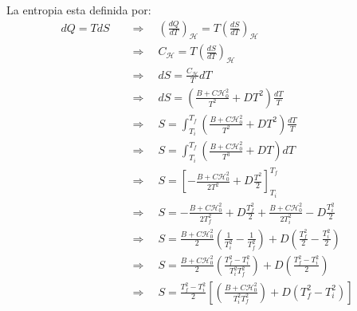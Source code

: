 \documentclass[a4paper]{article}
\begin{document}
    
    \begin{answer}[Punto 10]
        La entropia esta definida por:
        \begin{align*}
            dQ = TdS \quad &\Rightarrow \quad \left( \frac{dQ}{dT}\right)_{\mathscr{H}} = T \left(\frac{dS}{dT}\right)_\mathscr{H}\\
            &\Rightarrow \quad C_{\mathscr{H}} = T \left(\frac{dS}{dT}\right)_{\mathscr{H}}\\
            &\Rightarrow \quad dS = \frac{C_{\mathscr{H}}}{T}dT\\
            &\Rightarrow \quad dS = \left(\frac{B+C \mathscr{H}_0^2}{T^2}+D T^2\right)\frac{dT}{T}\\
            &\Rightarrow \quad S = \int_{T_i}^{T_f} \left(\frac{B+C \mathscr{H}_0^2}{T^2}+D T^2\right)\frac{dT}{T}\\
            &\Rightarrow \quad S = \int_{T_i}^{T_f} \left(\frac{B+C \mathscr{H}_0^2}{T^3}+D T\right)dT\\
            &\Rightarrow \quad S = \left[-\frac{B+C \mathscr{H}_0^2}{2T^2}+D \frac{T^2}{2}\right]_{T_i}^{T_f}\\
            &\Rightarrow \quad S = -\frac{B+C \mathscr{H}_0^2}{2T_f^2}+D \frac{T_f^2}{2} + \frac{B+C \mathscr{H}_0^2}{2T_i^2}-D \frac{T_i^2}{2}\\
            &\Rightarrow \quad S = \frac{B+C \mathscr{H}_0^2}{2}\left(\frac{1}{T_i^2}-\frac{1}{T_f^2}\right)+D \left(\frac{T_f^2}{2} -\frac{T_i^2}{2}\right)\\
            &\Rightarrow \quad S = \frac{B+C \mathscr{H}_0^2}{2}\left(\frac{T_f^2 - T_i^2}{T_i^2T_f^2}\right)+D \left(\frac{T_f^2 - T_i^2}{2}\right)\\
            &\Rightarrow \quad S =\frac{T_f^2 - T_i^2}2\left[ \left(\frac{B+C \mathscr{H}_0^2}{T_i^2T_f^2}\right)+D \left(T_f^2 - T_i^2\right)\right]\\
        \end{align*}
    \end{answer}
\end{document}
